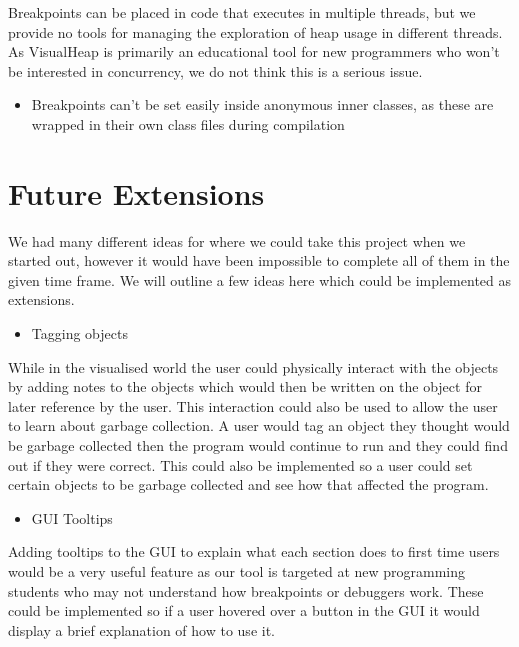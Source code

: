 \documentclass[11pt, a4paper]{report}
\begin{document}
Breakpoints can be placed in code that executes in multiple threads, but we provide no tools for managing the exploration of heap usage in different threads.  As VisualHeap is primarily an educational tool for new programmers who won’t be interested in concurrency, we do not think this is a serious issue.

\begin{itemize}
  \item Breakpoints can’t be set easily inside anonymous inner classes, as these are wrapped in their own class files during compilation
\end{itemize}

\chapter{Future Extensions}

We had many different ideas for where we could take this project when we started out, however it would have been impossible to complete all of them in the given time frame. We will outline a few ideas here which could be implemented as extensions.

\begin{itemize}
  \item Tagging objects
\end{itemize}

While in the visualised world the user could physically interact with the objects by adding notes to the objects which would then be written on the object for later reference by the user. This interaction could also be used to allow the user to learn about garbage collection. A user would tag an object they thought would be garbage collected then the program would continue to run and they could find out if they were correct. This could also be implemented so a user could set certain objects to be garbage collected and see how that affected the program.

\begin{itemize}
  \item GUI Tooltips
\end{itemize}

Adding tooltips to the GUI to explain what each section does to first time users would be a very useful feature as our tool is targeted at new programming students who may not understand how breakpoints or debuggers work. These could be implemented so if a user hovered over a button in the GUI it would display a brief explanation of how to use it.
\end{document}

